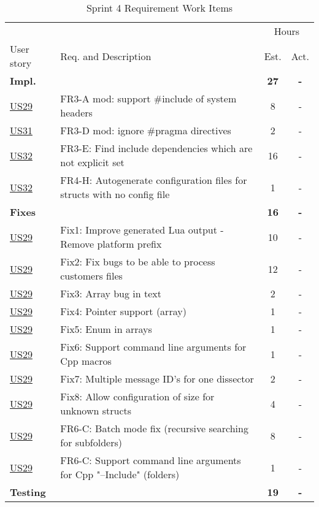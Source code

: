 \begin{table}[!htb] \small \center
\caption{Sprint 4 Requirement Work Items \label{tab:sprint4req}}
\begin{tabularx}{\textwidth}{l X c c}
	\toprule
	& & \multicolumn{2}{c}{Hours} \\
	\cmidrule(r){3-4}
	User story & Req. and Description & Est. & Act. \\
	\midrule
	\textbf{Impl.} &  & \textbf{27} & \textbf{-} \\
	\hyperref[tab:req:stories7]{US29} & FR3-A mod: support #include of system headers &  8  & - \\
	\hyperref[tab:req:stories8]{US31} & FR3-D mod: ignore #pragma directives & 2 & - \\
	\hyperref[tab:req:stories8]{US32} & FR3-E: Find include dependencies which are not explicit set & 16  & - \\
	\hyperref[tab:req:stories8]{US32} & FR4-H: Autogenerate configuration files for structs with no config file & 1  & - \\
	\addlinespace
	\textbf{Fixes} &  & \textbf{16} & \textbf{-} \\
	\hyperref[tab:req:stories7]{US29} & Fix1: Improve generated Lua output - Remove platform prefix & 10 & - \\
	\hyperref[tab:req:stories7]{US29} & Fix2: Fix bugs to be able to process customers files & 12 & - \\
	\hyperref[tab:req:stories7]{US29} & Fix3: Array bug in text & 2 & - \\
	\hyperref[tab:req:stories7]{US29} & Fix4: Pointer support (array) & 1 & - \\
	\hyperref[tab:req:stories7]{US29} & Fix5: Enum in arrays & 1 & - \\		
	\hyperref[tab:req:stories7]{US29} & Fix6: Support command line arguments for Cpp macros & 1 & - \\
	\hyperref[tab:req:stories7]{US29} & Fix7: Multiple message ID's for one dissector & 2 & - \\
	\hyperref[tab:req:stories7]{US29} & Fix8: Allow configuration of size for unknown structs & 4 & - \\
	\hyperref[tab:req:stories7]{US29} & FR6-C: Batch mode fix (recursive searching for subfolders) &  8  & - \\
	\hyperref[tab:req:stories7]{US29} & FR6-C: Support command line arguments for Cpp "--Include" (folders) & 1 & - \\
	\addlinespace
	\textbf{Testing} &  & \textbf{19} & \textbf{-} \\

\end{tabularx}
\end{table}
